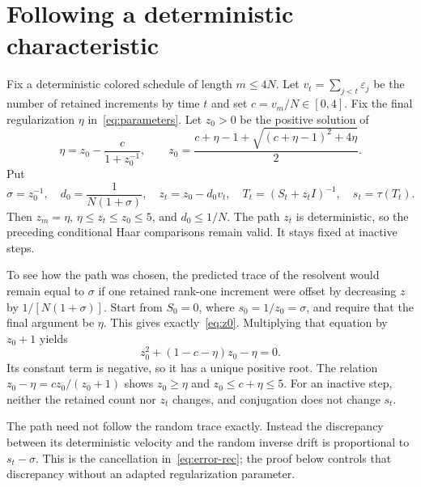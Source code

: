 \documentclass[11pt]{article}
\theoremstyle{definition}\newtheorem{definition}[theorem]{Definition}
\theoremstyle{remark}\newtheorem{remark}[theorem]{Remark}
\begin{document}
\section{Following a deterministic characteristic}\label{sec:characteristic}
Fix a deterministic colored schedule of length $m\le4N$. Let $v_t=\sum_{j<t}\varepsilon_j$ be the number of retained increments by time $t$ and set $c=v_m/N\in[0,4]$. Fix the final regularization $\eta$ in~\eqref{eq:parameters}. Let $z_0>0$ be the positive solution of
\begin{equation}\label{eq:z0}
 \eta=z_0-\frac{c}{1+z_0^{-1}},\qquad
 z_0=\frac{c+\eta-1+\sqrt{(c+\eta-1)^2+4\eta}}2.
\end{equation}
Put
\begin{equation}\label{eq:path}
 \sigma=z_0^{-1},\quad d_0=\frac1{N(1+\sigma)},\quad
 z_t=z_0-d_0v_t,\quad T_t=(S_t+z_tI)^{-1},\quad s_t=\tau(T_t).
\end{equation}
Then $z_m=\eta$, $\eta\le z_t\le z_0\le5$, and $d_0\le1/N$. The path $z_t$ is deterministic, so the preceding conditional Haar comparisons remain valid. It stays fixed at inactive steps.


To see how the path was chosen, the predicted trace of the resolvent would remain equal to $\sigma$ if one retained rank-one increment were offset by decreasing $z$ by $1/[N(1+\sigma)]$. Start from $S_0=0$, where $s_0=1/z_0=\sigma$, and require that the final argument be $\eta$. This gives exactly~\eqref{eq:z0}. Multiplying that equation by $z_0+1$ yields
\[
 z_0^2+(1-c-\eta)z_0-\eta=0.
\]
Its constant term is negative, so it has a unique positive root. The relation
$z_0-\eta=c z_0/(z_0+1)$ shows $z_0\ge\eta$ and $z_0\le c+\eta\le5$. For an inactive step, neither the retained count nor $z_t$ changes, and conjugation does not change $s_t$.

The path need not follow the random trace exactly. Instead the discrepancy between its deterministic velocity and the random inverse drift is proportional to $s_t-\sigma$. This is the cancellation in~\eqref{eq:error-rec}; the proof below controls that discrepancy without an adapted regularization parameter.
\end{document}
